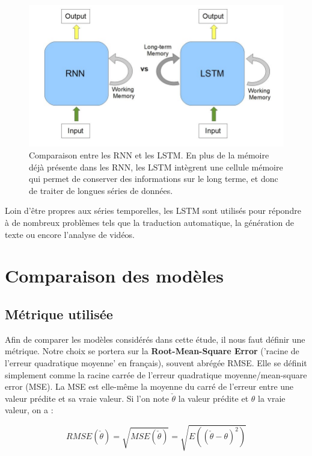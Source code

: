 \documentclass[french]{article}
\begin{document}
    
    \begin{figure}[h!]
        \includegraphics[width=12cm]{RNNvsLSTM}
        \centering
        \caption{Comparaison entre les RNN et les LSTM. En plus de la mémoire déjà présente dans les RNN, les LSTM intègrent une cellule mémoire qui permet de conserver des informations sur le long terme, et donc de traiter de longues séries de données.}
        \centering
    \end{figure}

    Loin d'être propres aux séries temporelles, les LSTM sont utilisés pour répondre à de nombreux problèmes tels que la traduction automatique, la génération de texte ou encore l'analyse de vidéos.

    \section{Comparaison des modèles}

    \subsection{Métrique utilisée}
    
    Afin de comparer les modèles considérés dans cette étude, il nous faut définir une métrique. Notre choix se portera sur la \textbf{Root-Mean-Square Error} ('racine de l'erreur quadratique moyenne' en français), souvent abrégée RMSE. Elle se définit simplement comme la racine carrée de l'erreur quadratique moyenne/mean-square error (MSE). La MSE est elle-même la moyenne du carré de l'erreur entre une valeur prédite et sa vraie valeur. Si l'on note $\check{\theta}$ la valeur prédite et $\theta$ la vraie valeur, on a :
    
    \begin{equation}RMSE(\check{\theta}) =  \sqrt{MSE(\check{\theta})} = \sqrt{E((\check{\theta} - \theta)^2)}\end{equation}
\end{document}
